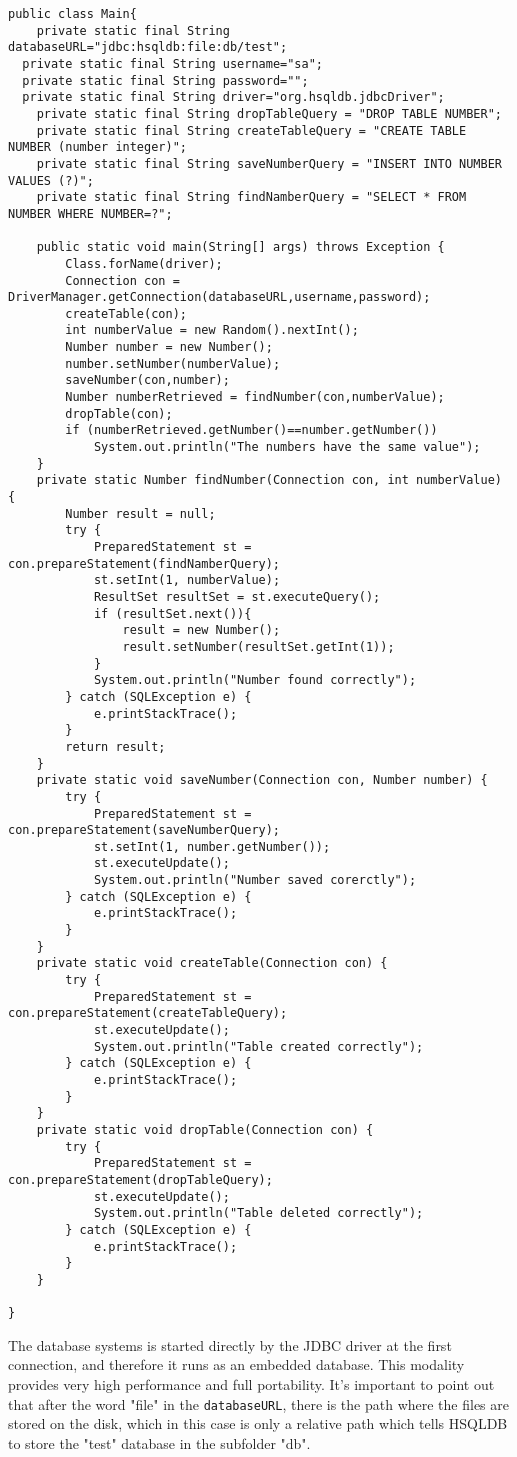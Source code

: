 \begin{lstlisting}[caption={HSQLDB implementation},label={hsqldb-implementation}]
public class Main{	
	private static final String databaseURL="jdbc:hsqldb:file:db/test";
  private static final String username="sa";
  private static final String password="";
  private static final String driver="org.hsqldb.jdbcDriver";    
	private static final String dropTableQuery = "DROP TABLE NUMBER";
	private static final String createTableQuery = "CREATE TABLE NUMBER (number integer)";
	private static final String saveNumberQuery = "INSERT INTO NUMBER VALUES (?)";
	private static final String findNamberQuery = "SELECT * FROM NUMBER WHERE NUMBER=?";

	public static void main(String[] args) throws Exception {
		Class.forName(driver);
		Connection con = DriverManager.getConnection(databaseURL,username,password);		
		createTable(con);
		int numberValue = new Random().nextInt();
		Number number = new Number();
		number.setNumber(numberValue);
		saveNumber(con,number);
		Number numberRetrieved = findNumber(con,numberValue);
		dropTable(con);		
		if (numberRetrieved.getNumber()==number.getNumber())
			System.out.println("The numbers have the same value");
	}	
	private static Number findNumber(Connection con, int numberValue) {
		Number result = null;
		try {
			PreparedStatement st = con.prepareStatement(findNamberQuery);
			st.setInt(1, numberValue);
			ResultSet resultSet = st.executeQuery();
			if (resultSet.next()){
				result = new Number();
				result.setNumber(resultSet.getInt(1));
			}
			System.out.println("Number found correctly");	
		} catch (SQLException e) {
			e.printStackTrace();
		} 	
		return result;
	}
	private static void saveNumber(Connection con, Number number) {
		try {
			PreparedStatement st = con.prepareStatement(saveNumberQuery);
			st.setInt(1, number.getNumber());
			st.executeUpdate();
			System.out.println("Number saved corerctly");
		} catch (SQLException e) {
			e.printStackTrace();
		} 		
	}
	private static void createTable(Connection con) {
		try {
			PreparedStatement st = con.prepareStatement(createTableQuery);
			st.executeUpdate();
			System.out.println("Table created correctly");
		} catch (SQLException e) {
			e.printStackTrace();
		} 	
	}
	private static void dropTable(Connection con) {
		try {
			PreparedStatement st = con.prepareStatement(dropTableQuery);
			st.executeUpdate();
			System.out.println("Table deleted correctly");
		} catch (SQLException e) {
			e.printStackTrace();
		}
	}
	
}
\end{lstlisting}
The database systems is started directly by the JDBC driver at the first connection, and therefore it runs as an embedded database. This modality provides very high performance and full portability. It's important to point out that after the word "file" in the \lstinline!databaseURL!, there is the path where the files are stored on the disk, which in this case is only a relative path which tells HSQLDB to store the "test" database in the subfolder "db".


